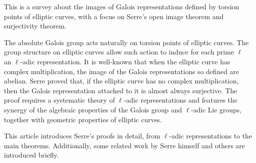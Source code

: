 This is a survey about the images of Galois representations defined by torsion points of elliptic curves, with a focus on Serre’s open image theorem and surjectivity theorem.

The absolute Galois group acts naturally on torsion points of elliptic curves. The group structure on elliptic curves allow such action to induce for each prime $\ell$ an $\ell$-adic representation.
It is well-known that when the elliptic curve has complex multiplication, the image of the Galois representations so defined are abelian.
Serre proved that, if the elliptic curve has no complex multiplication, then the Galois representation attached to it is almost always surjective.
The proof requires a systematic theory of $\ell$-adic representations and features the synergy of the algebraic properties of the Galois group and $\ell$-adic Lie groups, together with geometric properties of elliptic curves.

This article introduces Serre’s proofs in detail, from $\ell$-adic representations to the main theorems. Additionally, some related work by Serre himself and others are introduced briefly.
